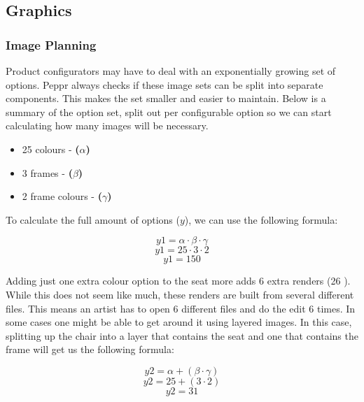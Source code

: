 \subsection{Graphics}

\subsubsection{Image Planning}
Product configurators may have to deal with an exponentially growing set of options. Peppr always checks if these image sets can be split into separate components. This makes the set smaller and easier to maintain. Below is a summary of the option set, split out per configurable option so we can start calculating how many images will be necessary.
\begin{itemize}
	\item 25 colours - \textbf{(\( \alpha \))}
	\item 3 frames - \textbf{(\( \beta \))}
	\item 2 frame colours - \textbf{(\( \gamma \))}
\end{itemize}

To calculate the full amount of options ($y$), we can use the following formula:
 
\[ y1 = \alpha \cdot \beta \cdot \gamma\]
\[ y1 = 25 \cdot 3 \cdot 2\]
\[ y1 = 150\]

Adding just one extra colour option to the seat more adds 6 extra renders (26  ). While this does not seem like much, these renders are built from several different files. This means an artist has to open 6 different files and do the edit 6 times.
In some cases one might be able to get around it using layered images. In this case, splitting up the chair into a layer that contains the seat and one that contains the frame will get us the following formula:

\[ y2 = \alpha + (\beta \cdot \gamma)\]
\[ y2 = 25 + (3 \cdot 2) \]
\[ y2 = 31\]

